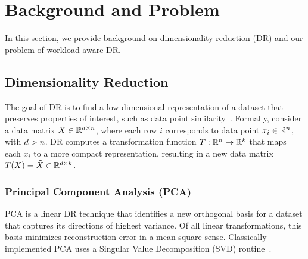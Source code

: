 \section{Background and Problem}
\label{sec:background}

In this section, we provide background on dimensionality reduction (DR) and our problem of workload-aware DR.

\subsection{Dimensionality Reduction}
\label{sec:defs}

The goal of DR is to find a low-dimensional representation of a dataset that preserves properties of interest, such as data point similarity~\cite{dr-survey1,dr-survey2}. Formally, consider a data matrix $X \in \mathbb{R}^{{\color{black}d} \times {\color{black}n}}$, where each row $i$ corresponds to data point $x_i \in \mathbb{R}^{\color{black}n}$, with ${\color{black}d} > {\color{black}n}$.  
DR computes a transformation function $T: \mathbb{R}^{\color{black}n} \rightarrow \mathbb{R}^k$ that maps each $x_i$ to a more compact representation, resulting in a new data matrix $T(X) = \tilde{X} \in \mathbb{R}^{{\color{black}d} \times k}$.

\subsubsection*{Principal Component Analysis (PCA)}
\label{sec:pca}
PCA is a linear DR technique that identifies a new orthogonal basis for a dataset that captures its directions of highest variance.
Of all linear transformations, this basis minimizes reconstruction error in a mean square sense. 
Classically implemented PCA uses a Singular Value Decomposition (SVD) routine~\cite{trefethen}.


